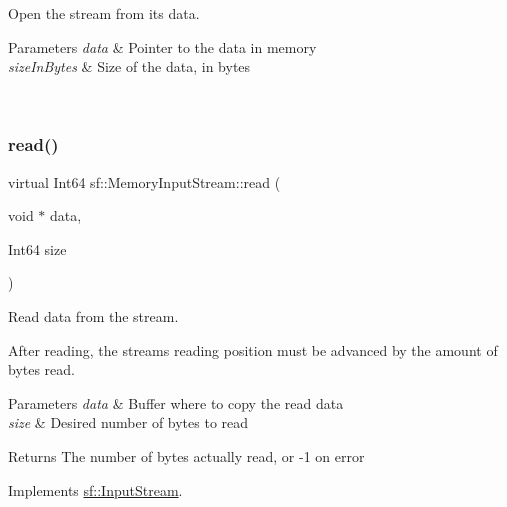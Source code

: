 Open the stream from its data. 


\begin{DoxyParams}{Parameters}
{\em data} & Pointer to the data in memory \\
\hline
{\em size\+In\+Bytes} & Size of the data, in bytes \begin{DoxyVerb}\end{DoxyVerb}
 \\
\hline
\end{DoxyParams}
\mbox{\label{classsf_1_1_memory_input_stream_adff5270c521819639154d42d76fd4c34}} 
\subsubsection{\texorpdfstring{read()}{read()}}
{\footnotesize\ttfamily virtual Int64 sf\+::\+Memory\+Input\+Stream\+::read (\begin{DoxyParamCaption}\item[{void $\ast$}]{data,  }\item[{Int64}]{size }\end{DoxyParamCaption})\hspace{0.3cm}{\ttfamily [virtual]}}



Read data from the stream. 

After reading, the stream\textquotesingle{}s reading position must be advanced by the amount of bytes read.


\begin{DoxyParams}{Parameters}
{\em data} & Buffer where to copy the read data \\
\hline
{\em size} & Desired number of bytes to read\\
\hline
\end{DoxyParams}
\begin{DoxyReturn}{Returns}
The number of bytes actually read, or -\/1 on error \begin{DoxyVerb}\end{DoxyVerb}
 
\end{DoxyReturn}


Implements \mbox{\hyperlink{classsf_1_1_input_stream_a8dd89c74c1acb693203f50e750c6ae53}{sf\+::\+Input\+Stream}}.

\mbox{\label{classsf_1_1_memory_input_stream_aa2ac8fda2bdb4c95248ae90c71633034}} 
